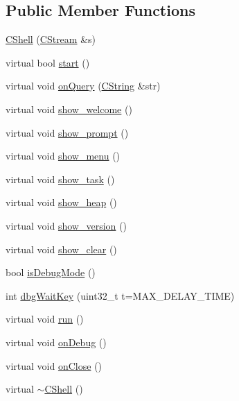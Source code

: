 \subsection*{Public Member Functions}
\begin{DoxyCompactItemize}
\item 
\hyperlink{class_c_shell_a66915a194065db1d82873d79ee6ec8c6}{C\-Shell} (\hyperlink{class_c_stream}{C\-Stream} \&s)
\item 
virtual bool \hyperlink{class_c_shell_a670f66f552494dfce94ee297ae0f659a}{start} ()
\item 
virtual void \hyperlink{class_c_shell_a16e1dae0dedda35c0be64d1c8f40e6b4}{on\-Query} (\hyperlink{class_c_string}{C\-String} \&str)
\item 
virtual void \hyperlink{class_c_shell_a34dfa6d370ce6fb517e1307d38a4982b}{show\-\_\-welcome} ()
\item 
virtual void \hyperlink{class_c_shell_a7adec131871fb1931300eb0f6b31b3f5}{show\-\_\-prompt} ()
\item 
virtual void \hyperlink{class_c_shell_ab499caffc2baf478802c3f89d606fc6c}{show\-\_\-menu} ()
\item 
virtual void \hyperlink{class_c_shell_ac9f0aa22624f3168256f6b6c851ec885}{show\-\_\-task} ()
\item 
virtual void \hyperlink{class_c_shell_a99cd1946dd501dd788accc421ffb883c}{show\-\_\-heap} ()
\item 
virtual void \hyperlink{class_c_shell_a4aed8c6a1e01a50595d9e8da8d1f88b2}{show\-\_\-version} ()
\item 
virtual void \hyperlink{class_c_shell_a8cb6ac07d2290e4d51c641af1d152b1f}{show\-\_\-clear} ()
\item 
bool \hyperlink{class_c_shell_ae0f6cb34ee627c44b1690d16d76d628f}{is\-Debug\-Mode} ()
\item 
int \hyperlink{class_c_shell_a7731a22b0b80a4facc431f6e07db2599}{dbg\-Wait\-Key} (uint32\-\_\-t t=M\-A\-X\-\_\-\-D\-E\-L\-A\-Y\-\_\-\-T\-I\-M\-E)
\item 
virtual void \hyperlink{class_c_shell_a1565a93fad9a1e35e05a597889ad130f}{run} ()
\item 
virtual void \hyperlink{class_c_shell_a74d294faaebd969b295366f4a861cf02}{on\-Debug} ()
\item 
virtual void \hyperlink{class_c_shell_a27a37bf5a22eaba1426655409decc188}{on\-Close} ()
\item 
virtual \hyperlink{class_c_shell_a342aa70c0ff0ba0f990942edfbc59bb6}{$\sim$\-C\-Shell} ()
\end{DoxyCompactItemize}
